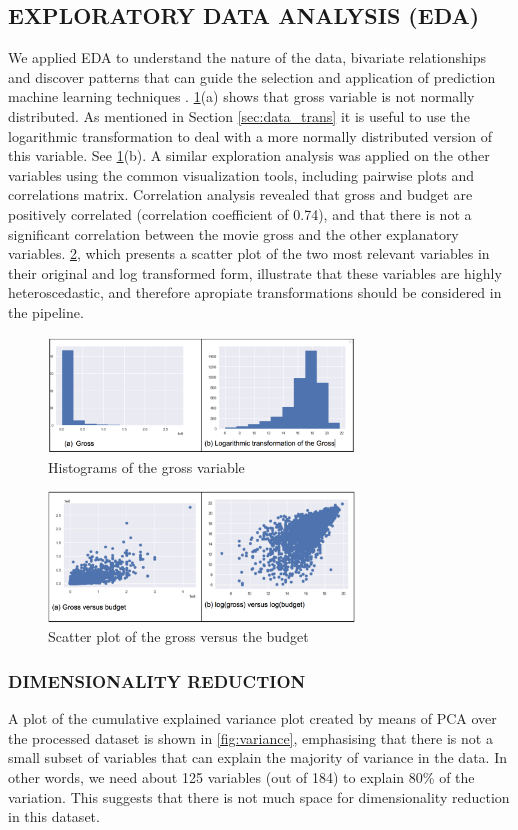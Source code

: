 \subsection{EXPLORATORY DATA ANALYSIS (EDA)}
We applied EDA to understand the nature of the data, bivariate relationships and discover patterns that can guide the selection and application of prediction machine learning techniques \cite{behrens1997principles}. \figurename{} \ref{fig:hist}(a) shows that gross variable is not normally distributed. As mentioned in Section \ref{sec:data_trans} it is useful to use the logarithmic transformation to deal with a more normally distributed version of this variable. See \figurename{} \ref{fig:hist}(b). A similar exploration analysis was applied on the other variables using the common visualization tools, including pairwise plots and correlations matrix. Correlation analysis revealed that gross and budget are positively correlated (correlation coefficient of 0.74), and that there is not a significant correlation between the movie gross and the other explanatory variables. \figurename{} \ref{fig:scatter}, which presents a scatter plot of the two most relevant variables in their original and log transformed form, illustrate that these variables are highly heteroscedastic, and therefore apropiate transformations should be considered in the pipeline.
\begin{figure}[hb]
\centering
\includegraphics[width=3.2in]{figures/hist}
\caption{Histograms of the gross variable} 
\label{fig:hist}
\end{figure}
\begin{figure}[hb]
\centering
\includegraphics[width=3.2in]{figures/scatter}
\caption{Scatter plot of the gross versus the budget} 
\label{fig:scatter}
\end{figure}

\subsubsection{DIMENSIONALITY REDUCTION}
A plot of the cumulative explained variance plot created by means of PCA over the processed dataset is shown in \figurename{} \ref{fig:variance}, emphasising that there is not a small subset of variables that can explain the majority of variance in the data. In other words, we need about 125 variables (out of 184) to explain 80\% of the variation. This suggests that there is not much space for dimensionality reduction in this dataset.

